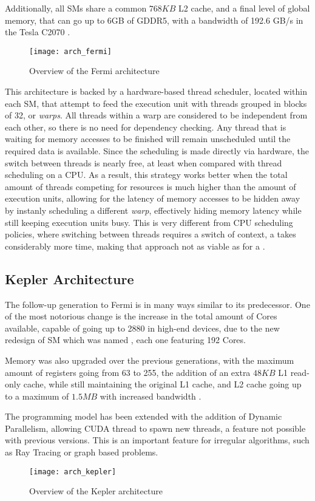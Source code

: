 \documentclass[main.tex]{subfiles}
\begin{document}
Additionally, all \acsp{SM} share a common $768KB$ L2 cache, and a final level of global memory, that can go up to 6GB of GDDR5, with a bandwidth of 192.6 GB/s in the Tesla C2070 \cite{NVIDIA:fermi}.

\begin{figure}[!htp]
  \centering
  \texttt{[image: arch\_fermi]}
  \caption{Overview of the Fermi architecture \label{fig:fermi}}
\end{figure}

This architecture is backed by a hardware-based thread scheduler, located within each \acs{SM}, that attempt to feed the execution unit with threads grouped in blocks of 32, or \textit{warps}. All threads within a warp are considered to be independent from each other, so there is no need for dependency checking. Any thread that is waiting for memory accesses to be finished will remain unscheduled until the required data is available. Since the scheduling is made directly via hardware, the switch between threads is nearly free, at least when compared with thread scheduling on a \acs{CPU}. As a result, this strategy works better when the total amount of threads competing for resources is much higher than the amount of execution units, allowing for the latency of memory accesses to be hidden away by instanly scheduling a different \textit{warp}, effectively hiding memory latency while still keeping execution units busy. This is very different from \acs{CPU} scheduling policies, where switching between threads requires a switch of context, a takes considerably more time, making that approach not as viable as for a \gpus.



\subsection{\nvidia Kepler Architecture}

The follow-up generation to Fermi is in many ways similar to its predecessor. One of the most notorious change is the increase in the total amount of \cuda Cores available, capable of going up to 2880 in high-end devices, due to the new redesign of \acl{SM} which was named \smx, each one featuring 192 \cuda Cores.

Memory was also upgraded over the previous generations, with the maximum amount of registers going from 63 to 255, the addition of an extra $48KB$ L1 read-only cache, while still maintaining the original L1 cache, and L2 cache going up to a maximum of $1.5MB$ with increased bandwidth \cite{NVIDIA:kepler}.

The programming model has been extended with the addition of Dynamic Parallelism, allowing \acs{CUDA} thread to spawn new threads, a feature not possible with previous versions. This is an important feature for irregular algorithms, such as Ray Tracing or graph based problems.

\begin{figure}
  \centering
  \texttt{[image: arch\_kepler]}
  \caption{Overview of the Kepler architecture \label{fig:kepler}}
\end{figure}
\end{document}
